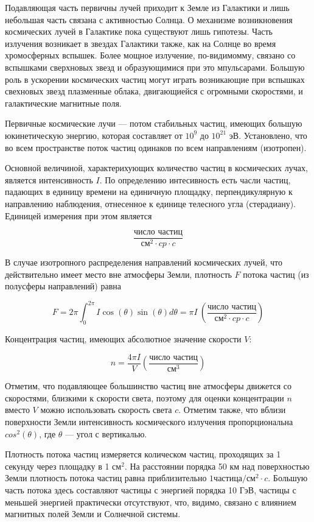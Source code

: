 \documentclass[14pt]{article}
\begin{document}
Подавляющая часть первичны лучей приходит к Земле из Галактики и лишь небольшая часть связана с активностью Солнца. О механизме возникновения космических лучей в Галактике пока существуют лишь гипотезы. Часть излучения возникает в звездах Галактики также, как на Солнце во время хромосферных вспышек. Более мощное излучение, по-видимомму, связано со вспышками сверхновых звезд и образующимися при это мпульсарами. Большую роль в ускорении космических частиц могут играть возникающие при вспышках свехновых звезд плазменные облака, двигающиейся с огромными скоростями, и галактические магнитные поля.

Первичные космические лучи --- потом стабильных частиц, имеющих большую юкинетическую энергию, которая составляет от $10^9$ до $10^{21}$ эВ. Установлено, что во всем пространстве поток частиц одинаков по всем направлениям (изотропен).

\vspace{0.5cm}
Основной величиной, характерихующих количество частиц в космических лучах, является интенсивность $I$. По определению интесивность есть часли частиц, падающих в единицу времени на единичную площадку, перпендикулярную к направлению наблюдения, отнесенное к единице телесного угла (стерадиану). Единицей измерения при этом является

$$\frac{\text{число частиц}}{\text{см}^2 \cdot cp \cdot c}$$

В случае изотропного распределения направлений космических лучей, что действительно имеет место вне атмосферы Земли, плотность $F$ потока частиц (из полусферы направлений) равна

$$F = 2\pi \int_0^{2\pi} I \cos(\theta)\sin(\theta)d\theta = \pi I~\left(\frac{\text{число частиц}}{\text{см}^2 \cdot cp \cdot c}\right)$$

\noindent Концентрация частиц, имеющих абсолютное значение скорости $V$:

$$n = \frac{4\pi I}{V} \left(\frac{\text{число частиц}}{\text{см}^3}\right)$$

\noindent Отметим, что подавляющее большинство частиц вне атмосферы движется со скоростями, близкими к скорости света, поэтому для оценки концентрации $n$ вместо $V$ можно использовать скорость света $c$. Отметим также, что вблизи поверхности Земли интенсивность космического излучения пропорциональна $cos^2(\theta)$, где $\theta$ --- угол с вертикалью. 

Плотность потока частиц измеряется колическом частиц, проходящих за 1 секунду через площадку в 1 $\text{см}^2$. На расстоянии порядка 50 км над поверхностью Земли плотность потока частиц равна приблизительно $1 \text{частица}/\text{см}^2 \cdot c$. Большую часть потока здесь составляют частицы с энергией порядка 10 ГэВ, частицы с меньшей энергией практически отсутствуют, что, видимо, связано с влиянием магнитных полей Земли и Солнечной системы. 
\end{document}
